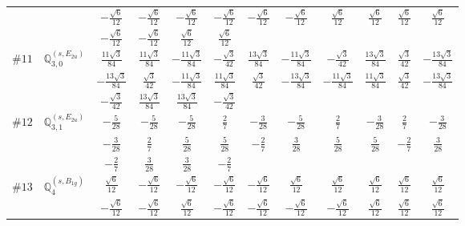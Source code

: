\documentclass[fleqn,9pt,landscape]{jsarticle}
\begin{document}
\begin{center}
\begin{longtable}{lcccccccccc}
& $ - \frac{\sqrt{6}}{12} $ & $ - \frac{\sqrt{6}}{12} $ & $ - \frac{\sqrt{6}}{12} $ & $ - \frac{\sqrt{6}}{12} $ & $ - \frac{\sqrt{6}}{12} $ & $ - \frac{\sqrt{6}}{12} $ & $ \frac{\sqrt{6}}{12} $ & $ \frac{\sqrt{6}}{12} $ & $ \frac{\sqrt{6}}{12} $ & $ \frac{\sqrt{6}}{12} $ \\
& $ - \frac{\sqrt{6}}{12} $ & $ - \frac{\sqrt{6}}{12} $ & $ \frac{\sqrt{6}}{12} $ & $ \frac{\sqrt{6}}{12} $ & $  $ & $  $ & $  $ & $  $ & $  $ & $  $ \\ \hline
$ \#11\quad \mathbb{Q}_{3,0}^{(s,E_{2u})} $ & $ \frac{11 \sqrt{3}}{84} $ & $ \frac{11 \sqrt{3}}{84} $ & $ - \frac{11 \sqrt{3}}{84} $ & $ - \frac{\sqrt{3}}{42} $ & $ \frac{13 \sqrt{3}}{84} $ & $ - \frac{11 \sqrt{3}}{84} $ & $ - \frac{\sqrt{3}}{42} $ & $ \frac{13 \sqrt{3}}{84} $ & $ \frac{\sqrt{3}}{42} $ & $ - \frac{13 \sqrt{3}}{84} $ \\
& $ - \frac{13 \sqrt{3}}{84} $ & $ \frac{\sqrt{3}}{42} $ & $ - \frac{11 \sqrt{3}}{84} $ & $ \frac{11 \sqrt{3}}{84} $ & $ \frac{\sqrt{3}}{42} $ & $ - \frac{13 \sqrt{3}}{84} $ & $ - \frac{11 \sqrt{3}}{84} $ & $ \frac{11 \sqrt{3}}{84} $ & $ \frac{\sqrt{3}}{42} $ & $ - \frac{13 \sqrt{3}}{84} $ \\
& $ - \frac{\sqrt{3}}{42} $ & $ \frac{13 \sqrt{3}}{84} $ & $ \frac{13 \sqrt{3}}{84} $ & $ - \frac{\sqrt{3}}{42} $ & $  $ & $  $ & $  $ & $  $ & $  $ & $  $ \\ \hline
$ \#12\quad \mathbb{Q}_{3,1}^{(s,E_{2u})} $ & $ - \frac{5}{28} $ & $ - \frac{5}{28} $ & $ - \frac{5}{28} $ & $ \frac{2}{7} $ & $ - \frac{3}{28} $ & $ - \frac{5}{28} $ & $ \frac{2}{7} $ & $ - \frac{3}{28} $ & $ \frac{2}{7} $ & $ - \frac{3}{28} $ \\
& $ - \frac{3}{28} $ & $ \frac{2}{7} $ & $ \frac{5}{28} $ & $ \frac{5}{28} $ & $ - \frac{2}{7} $ & $ \frac{3}{28} $ & $ \frac{5}{28} $ & $ \frac{5}{28} $ & $ - \frac{2}{7} $ & $ \frac{3}{28} $ \\
& $ - \frac{2}{7} $ & $ \frac{3}{28} $ & $ \frac{3}{28} $ & $ - \frac{2}{7} $ & $  $ & $  $ & $  $ & $  $ & $  $ & $  $ \\ \hline
$ \#13\quad \mathbb{Q}_{4}^{(s,B_{1g})} $ & $ \frac{\sqrt{6}}{12} $ & $ - \frac{\sqrt{6}}{12} $ & $ - \frac{\sqrt{6}}{12} $ & $ - \frac{\sqrt{6}}{12} $ & $ - \frac{\sqrt{6}}{12} $ & $ \frac{\sqrt{6}}{12} $ & $ \frac{\sqrt{6}}{12} $ & $ \frac{\sqrt{6}}{12} $ & $ \frac{\sqrt{6}}{12} $ & $ \frac{\sqrt{6}}{12} $ \\
& $ - \frac{\sqrt{6}}{12} $ & $ - \frac{\sqrt{6}}{12} $ & $ \frac{\sqrt{6}}{12} $ & $ - \frac{\sqrt{6}}{12} $ & $ - \frac{\sqrt{6}}{12} $ & $ - \frac{\sqrt{6}}{12} $ & $ - \frac{\sqrt{6}}{12} $ & $ \frac{\sqrt{6}}{12} $ & $ \frac{\sqrt{6}}{12} $ & $ \frac{\sqrt{6}}{12} $ \\

\end{longtable}
\end{center}
\end{document}
